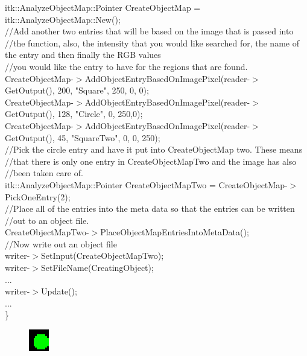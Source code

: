\documentclass{InsightArticle}
\begin{document}
\begin{itemize}
{itk::AnalyzeObjectMap::Pointer CreateObjectMap = itk::AnalyzeObjectMap::New();\\

//Add another two entries that will be based on the image that is passed into \\
//the function, also, the intensity that you would like searched for, the name of the entry and then finally the RGB values\\
//you would like the entry to have for the regions that are found.\\
CreateObjectMap-$>$AddObjectEntryBasedOnImagePixel(reader-$>$GetOutput(), 200, "Square", 250, 0, 0);\\
CreateObjectMap-$>$AddObjectEntryBasedOnImagePixel(reader-$>$GetOutput(), 128, "Circle", 0, 250,0);\\
CreateObjectMap-$>$AddObjectEntryBasedOnImagePixel(reader-$>$GetOutput(), 45,  "SquareTwo", 0, 0, 250);\\

//Pick the circle entry and have it put into CreateObjectMap two.  These means\\
  //that there is only one entry in CreateObjectMapTwo and the image has also\\
//been taken care of.\\
itk::AnalyzeObjectMap::Pointer CreateObjectMapTwo = CreateObjectMap-$>$PickOneEntry(2);\\

//Place all of the entries into the meta data so that the entries can be written\\
//out to an object file.\\
CreateObjectMapTwo-$>$PlaceObjectMapEntriesIntoMetaData();\\

//Now write out an object file\\
writer-$>$SetInput(CreateObjectMapTwo);\\
writer-$>$SetFileName(CreatingObject);\\
...\\
writer-$>$Update();\\
...\\
\}
}
\begin{figure}[h]
\center
\includegraphics[width=.14\textwidth]{circle.eps}
\label{fig:StreamingConceptDiagram}
\end{figure}


\end{itemize}
\end{document}
